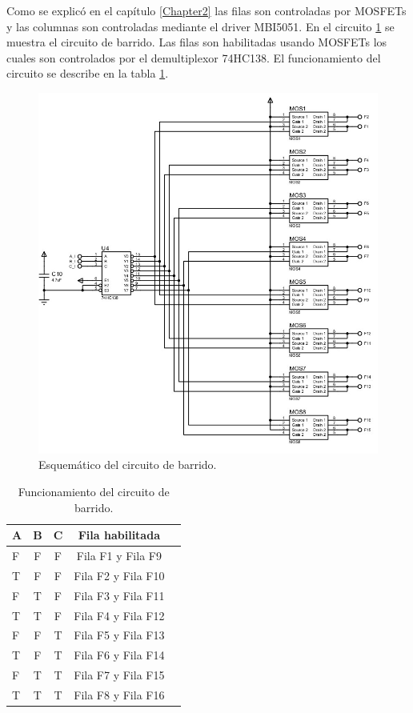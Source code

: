 Como se explicó en el capítulo \ref{Chapter2} las filas son controladas por MOSFETs y las columnas son controladas mediante el driver MBI5051. En el circuito \ref{fig:circuitobarrido} se muestra el circuito de barrido. Las filas son habilitadas usando MOSFETs los cuales son controlados por el demultiplexor 74HC138. El funcionamiento del circuito se describe en la tabla \ref{tab:funcionamientobarrido}.

\begin{figure}[htpb]
	\centering
    \includegraphics[scale=0.5]{Figures/circuitoBarrido.jpg} 
	\caption{Esquemático del circuito de barrido.}
	\label{fig:circuitobarrido}
\end{figure}


\begin{table}[h]
\centering
\caption[Funcionamiento circuito barrido]{Funcionamiento del circuito de barrido.}
\begin{tabular}{l c c c c}
\toprule
\textbf{A}& \textbf{B} & \textbf{C} & \textbf{Fila habilitada}\\
\midrule 


F &F &F &Fila F1 y Fila F9\\
T &F &F &Fila F2 y Fila F10\\
F &T &F &Fila F3 y Fila F11\\
T &T &F &Fila F4 y Fila F12\\
F &F &T &Fila F5 y Fila F13\\
T &F &T &Fila F6 y Fila F14\\
F &T &T &Fila F7 y Fila F15\\
T &T &T &Fila F8 y Fila F16\\


\bottomrule
\hline
\end{tabular}
\label{tab:funcionamientobarrido}
\end{table}


